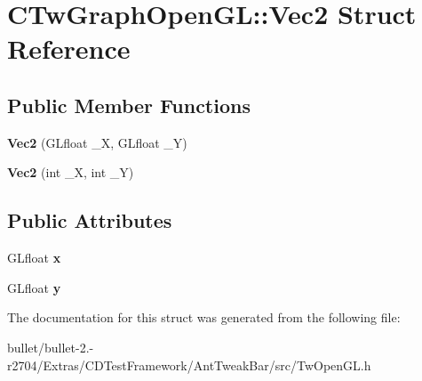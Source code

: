 \hypertarget{struct_c_tw_graph_open_g_l_1_1_vec2}{\section{C\+Tw\+Graph\+Open\+G\+L\+:\+:Vec2 Struct Reference}
\label{struct_c_tw_graph_open_g_l_1_1_vec2}
}
\subsection*{Public Member Functions}
\begin{DoxyCompactItemize}
\item 
\hypertarget{struct_c_tw_graph_open_g_l_1_1_vec2_aefa3420f9afbcc1a09babe8560095628}{{\bfseries Vec2} (G\+Lfloat \+\_\+\+X, G\+Lfloat \+\_\+\+Y)}\label{struct_c_tw_graph_open_g_l_1_1_vec2_aefa3420f9afbcc1a09babe8560095628}

\item 
\hypertarget{struct_c_tw_graph_open_g_l_1_1_vec2_a1210996be6862cd9567ca7c545b9d5b7}{{\bfseries Vec2} (int \+\_\+\+X, int \+\_\+\+Y)}\label{struct_c_tw_graph_open_g_l_1_1_vec2_a1210996be6862cd9567ca7c545b9d5b7}

\end{DoxyCompactItemize}
\subsection*{Public Attributes}
\begin{DoxyCompactItemize}
\item 
\hypertarget{struct_c_tw_graph_open_g_l_1_1_vec2_aa6d3bdcbb125d28a899cad5dfae2a58b}{G\+Lfloat {\bfseries x}}\label{struct_c_tw_graph_open_g_l_1_1_vec2_aa6d3bdcbb125d28a899cad5dfae2a58b}

\item 
\hypertarget{struct_c_tw_graph_open_g_l_1_1_vec2_af05f59899ff69aeceb970c2dae14d3b4}{G\+Lfloat {\bfseries y}}\label{struct_c_tw_graph_open_g_l_1_1_vec2_af05f59899ff69aeceb970c2dae14d3b4}

\end{DoxyCompactItemize}


The documentation for this struct was generated from the following file\+:\begin{DoxyCompactItemize}
\item 
bullet/bullet-\/2.-\/r2704/\+Extras/\+C\+D\+Test\+Framework/\+Ant\+Tweak\+Bar/src/Tw\+Open\+G\+L.\+h\end{DoxyCompactItemize}
